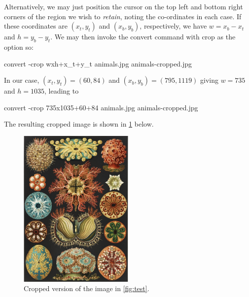 \documentclass[
  11pt,
  british,
  a4paper,
]{article}
\newenvironment{Shaded}{\begin{snugshade}}{\end{snugshade}}
\newcommand{\AttributeTok}[1]{\textcolor[rgb]{0.80,0.80,0.80}{#1}}
\newcommand{\ExtensionTok}[1]{\textcolor[rgb]{0.80,0.80,0.80}{#1}}
\newcommand{\NormalTok}[1]{\textcolor[rgb]{0.80,0.80,0.80}{#1}}
\newcommand{\StringTok}[1]{\textcolor[rgb]{0.80,0.58,0.58}{#1}}
\begin{document}
Alternatively, we may just position the cursor on the top left and
bottom right corners of the region we wish to \emph{retain}, noting the
co-ordinates in each case. If these coordinates are \((x_t, y_t)\) and
\((x_b, y_b)\), respectively, we have \(w = x_b - x_t\) and
\(h = y_b -y_t\). We may then invoke the convert command with crop as
the option so:

\begin{Shaded}
\begin{Highlighting}[]
\ExtensionTok{convert} \AttributeTok{{-}crop} \StringTok{\textquotesingle{}wxh+x\_t+y\_t\textquotesingle{}}\NormalTok{ animals.jpg animals{-}cropped.jpg}
\end{Highlighting}
\end{Shaded}

In our case, \((x_t, y_t) = (60, 84)\) and \((x_b, y_b) = (795, 1119)\)
giving \(w = 735\) and \(h = 1035\), leading to

\begin{Shaded}
\begin{Highlighting}[]
\ExtensionTok{convert} \AttributeTok{{-}crop} \StringTok{\textquotesingle{}735x1035+60+84\textquotesingle{}}\NormalTok{ animals.jpg animals{-}cropped.jpg}
\end{Highlighting}
\end{Shaded}

The resulting cropped image is shown in \cref{fig:cropped} below.

\begin{figure}
\hypertarget{fig:cropped}{%
\centering
\includegraphics[width=0.5\textwidth,height=\textheight]{images/test-cropped.jpg}
\caption{Cropped version of the image in
\cref{fig:test}.}\label{fig:cropped}
}
\end{figure}
\end{document}
